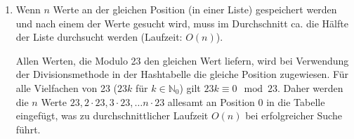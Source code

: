 \documentclass[11pt,a4paper]{article}
\begin{document}
\begin{loesung}
    \begin{enumerate}
        \item Wenn $n$ Werte an der gleichen Position (in einer Liste) gespeichert werden und nach einem der Werte gesucht wird, muss im Durchschnitt ca. die Hälfte der Liste durchsucht werden (Laufzeit: $O(n)$).

        Allen Werten, die Modulo 23 den gleichen Wert liefern, wird bei Verwendung der Divisionsmethode in der Hashtabelle die gleiche Position zugewiesen.
        Für alle Vielfachen von 23 ($23k$ für $k \in \mathbb{N}_0$) gilt $23k \equiv 0 \mod{23}$.
        Daher werden die $n$ Werte $23, 2 \cdot 23, 3 \cdot 23, \ldots n \cdot 23$ allesamt an Position $0$ in die Tabelle eingefügt, was zu durchschnittlicher Laufzeit $O(n)$ bei erfolgreicher Suche führt.
        

\end{enumerate}
\end{loesung}
\end{document}

